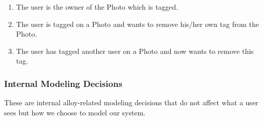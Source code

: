 \documentclass[titlepage]{article}
\begin{document}
\begin{enumerate}
\begin{enumerate}
\begin{enumerate}
			                  \begin{enumerate}
				                  \item The user is the owner of the Photo which is tagged.
				                  \item The user is tagged on a Photo and wants to remove his/her own tag from the Photo.
				                  \item The user has tagged another user on a Photo and now wants to remove this tag.
			                  \end{enumerate}
		            \end{enumerate}
	      \end{enumerate}
\end{enumerate}

\subsubsection{Internal Modeling Decisions}
These are internal alloy-related modeling decisions that do not affect what a user sees but how we choose to model our system.
\end{document}
